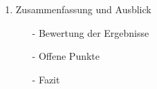 \begin{enumerate}
	\item Zusammenfassung und Ausblick
	\begin{itemize}
		\item[-] Bewertung der Ergebnisse		
		\item[-] Offene Punkte
		\item[-] Fazit
	\end{itemize}
\end{enumerate}


